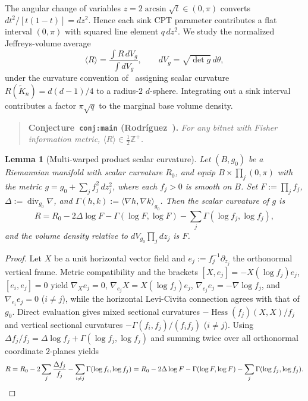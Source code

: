 \documentclass[11pt]{article}
\theoremstyle{plain}
\newtheorem{lemma}[theorem]{Lemma}
\theoremstyle{definition}
\theoremstyle{remark}
\DeclareMathOperator{\Hess}{Hess}
\DeclareMathOperator{\divop}{div}
\begin{document}
The angular change of variables $z = 2\arcsin\sqrt{t} \in (0, \pi)$ converts $dt^2/[t(1-t)] = dz^2$. Hence each sink CPT parameter contributes a flat interval $(0, \pi)$ with squared line element $q\,dz^2$. We study the normalized Jeffreys-volume average
\[
\langle R \rangle = \frac{\int R\,dV_g}{\int dV_g}, \qquad dV_g = \sqrt{\det g}\,d\theta,
\]
under the curvature convention of~\cite{Rodriguez2004,Rodriguez2026} assigning scalar curvature $R(\tilde{K}_n) = d(d-1)/4$ to a radius-$2$ $d$-sphere. Integrating out a sink interval contributes a factor $\pi\sqrt{q}$ to the marginal base volume density.

\begin{quote}
\textbf{Conjecture~\texttt{conj:main} (Rodr\'iguez~\cite{Rodriguez2004,Rodriguez2026}).}
\emph{For any bitnet with Fisher information metric, $\langle R \rangle \in \tfrac{1}{2}\mathbb{Z}^+$.}
\end{quote}

\begin{lemma}[Multi-warped product scalar curvature]\label{lem:warped}
Let $(B, g_0)$ be a Riemannian manifold with scalar curvature $R_0$, and equip $B \times \prod_j (0, \pi)$ with the metric $g = g_0 + \sum_j f_j^2\,dz_j^2$, where each $f_j > 0$ is smooth on $B$. Set $F := \prod_j f_j$, $\Delta := \divop_{g_0}\nabla$, and $\Gamma(h, k) := \langle \nabla h, \nabla k \rangle_{g_0}$. Then the scalar curvature of $g$ is
\begin{equation}\label{eq:warped}
R = R_0 - 2\Delta\log F - \Gamma(\log F, \log F) - \sum_j \Gamma(\log f_j, \log f_j),
\end{equation}
and the volume density relative to $dV_{g_0}\prod_j dz_j$ is $F$.
\end{lemma}

\begin{proof}
Let $X$ be a unit horizontal vector field and $e_j := f_j^{-1}\partial_{z_j}$ the orthonormal vertical frame. Metric compatibility and the brackets $[X, e_j] = -X(\log f_j)e_j$, $[e_i, e_j] = 0$ yield $\nabla_X e_j = 0$, $\nabla_{e_j} X = X(\log f_j)e_j$, $\nabla_{e_j} e_j = -\nabla\log f_j$, and $\nabla_{e_i} e_j = 0$ ($i \neq j$), while the horizontal Levi-Civita connection agrees with that of $g_0$. Direct evaluation gives mixed sectional curvatures $-\Hess(f_j)(X, X)/f_j$ and vertical sectional curvatures $-\Gamma(f_i, f_j)/(f_i f_j)$ ($i \neq j$). Using $\Delta f_j / f_j = \Delta\log f_j + \Gamma(\log f_j, \log f_j)$ and summing twice over all orthonormal coordinate $2$-planes yields
\[
R = R_0 - 2\sum_j \frac{\Delta f_j}{f_j} - \sum_{i \neq j} \Gamma(\log f_i, \log f_j)
  = R_0 - 2\Delta\log F - \Gamma(\log F, \log F) - \sum_j \Gamma(\log f_j, \log f_j). \qedhere
\]
\end{proof}
\end{document}

